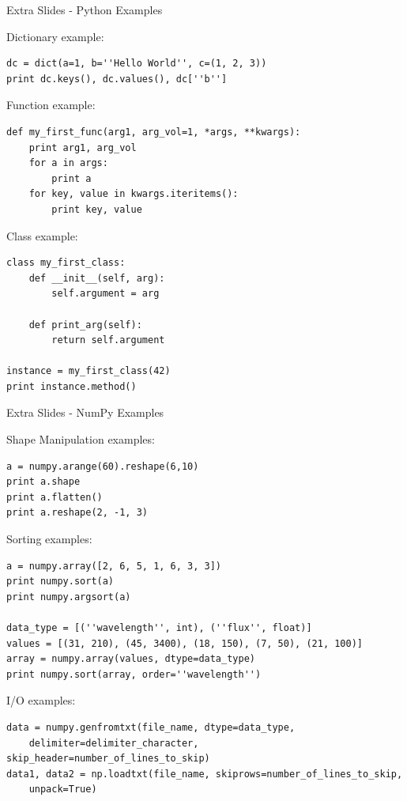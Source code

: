 \documentclass{beamer}
\begin{document}
\begin{frame}[fragile]{Extra Slides - Python Examples}
  \fontsize{7pt}{7}\selectfont
  \begin{block}{Dictionary example:}
  \begin{lstlisting}
dc = dict(a=1, b=''Hello World'', c=(1, 2, 3))
print dc.keys(), dc.values(), dc[''b'']
  \end{lstlisting}
  \end{block}
  \begin{block}{Function example:}
  \begin{lstlisting}
def my_first_func(arg1, arg_vol=1, *args, **kwargs):
    print arg1, arg_vol
    for a in args:
        print a
    for key, value in kwargs.iteritems():
        print key, value
  \end{lstlisting}
  \end{block}
  \begin{block}{Class example:}
  \begin{lstlisting}
class my_first_class:
    def __init__(self, arg):
        self.argument = arg

    def print_arg(self):
        return self.argument

instance = my_first_class(42)
print instance.method()
  \end{lstlisting}
  \end{block}
\end{frame}

\begin{frame}[fragile]{Extra Slides - NumPy Examples}
  \fontsize{7pt}{7}\selectfont
  \begin{block}{Shape Manipulation examples:}
  \begin{lstlisting}
a = numpy.arange(60).reshape(6,10)
print a.shape
print a.flatten()
print a.reshape(2, -1, 3)  
  \end{lstlisting}
  \end{block}
  \begin{block}{Sorting examples:}
  \begin{lstlisting}
a = numpy.array([2, 6, 5, 1, 6, 3, 3])
print numpy.sort(a)
print numpy.argsort(a)

data_type = [(''wavelength'', int), (''flux'', float)]
values = [(31, 210), (45, 3400), (18, 150), (7, 50), (21, 100)]
array = numpy.array(values, dtype=data_type)
print numpy.sort(array, order=''wavelength'')
  \end{lstlisting}
  \end{block}
  \begin{block}{I/O examples:}
  \begin{lstlisting}
data = numpy.genfromtxt(file_name, dtype=data_type, 
    delimiter=delimiter_character, skip_header=number_of_lines_to_skip)
data1, data2 = np.loadtxt(file_name, skiprows=number_of_lines_to_skip, 
    unpack=True)
  \end{lstlisting}
  \end{block}
\end{frame}
\end{document}
